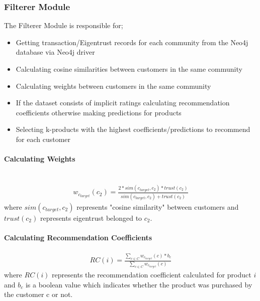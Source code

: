 	\subsubsection{Filterer Module} The Filterer Module is responsible for;
	\begin{itemize}
		\item Getting transaction/Eigentrust records for each community from the Neo4j database via Neo4j driver
		\item Calculating cosine similarities between customers in the same community
		\item Calculating weights between customers in the same community
		\item If the dataset consists of implicit ratings calculating recommendation coefficients otherwise making predictions for products
		\item Selecting k-products with the highest coefficients/predictions to recommend for each customer
	\end{itemize}

	\paragraph{Calculating Weights} \mbox{}\\
	\begin{equation*} 
	\begin{split}
	w_{c_{target}}(c_{2}) = \frac{2*sim(c_{target},c_{2})*trust(c_{2})}{sim(c_{target},c_{2})+trust(c_{2})}
	\end{split}
	\end{equation*}
	where $sim(c_{target},c_{2})$ represents "cosine similarity" between customers and $trust(c_{2})$ represents eigentrust belonged to $c_{2}$.

	\paragraph{Calculating Recommendation Coefficients}	
	\begin{equation*} 
	\begin{split}
	RC(i) = \frac{\sum_{c \in C}^{} w_{c_{target}}(c)*b_{c}}{\sum_{c \in C}^{} w_{c_{target}}(c)}
	\end{split}
	\end{equation*}
	where $RC(i)$ represents the recommendation coefficient calculated for product $i$ and $b_{c}$ is a boolean value which indicates whether the product was purchased by the customer c or not.


